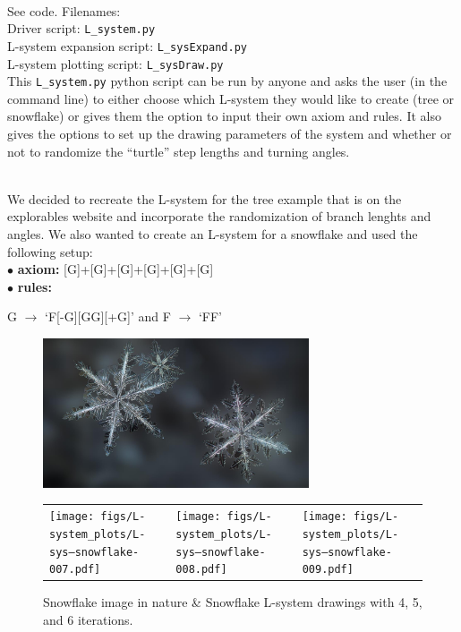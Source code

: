 \documentclass[11pt, oneside]{article}   	%
\newcommand{\prob}[2]{
\indent \\
\noindent{\color{green!50!blue}\bf {\large#1.}}
{\normalfont #2}
}
\begin{document}
\prob{1}{See code. Filenames:}\\
	\indent Driver script: \texttt{L\_system.py} \\
	\indent L-system expansion script: \texttt{L\_sysExpand.py} \\
	\indent L-system plotting script: \texttt{L\_sysDraw.py}\\
	This \texttt{L\_system.py} python script can be run by anyone and asks the user (in the command line) to either choose which L-system they would like to create (tree or snowflake) or gives them the option to input their own axiom and rules. It also gives the options to set up the drawing parameters of the system and whether or not to randomize the ``turtle'' step lengths and turning angles.

\prob{2}{We decided to recreate the L-system for the tree example that is on the explorables website and incorporate the randomization of branch lenghts and angles. We also wanted to create an L-system for a snowflake and used the following setup:\\
	\indent $\bullet$ {\bf axiom:}
	[G]+[G]+[G]+[G]+[G]+[G]
	\\
	\indent $\bullet$ {\bf rules:}}
	G $\rightarrow$ `F[-G][GG][+G]' and F $\rightarrow$ `FF'
	\begin{figure}[h!]
		\centering
		\vspace{-3mm}
		\includegraphics[width=0.7\textwidth]{figs/snowflake}
		\begin{tabular}{lll}
			\texttt{[image: figs/L-system\_plots/L-sys--snowflake-007.pdf]}
			&			\hspace{-9mm}
			\texttt{[image: figs/L-system\_plots/L-sys--snowflake-008.pdf]}
			&			\hspace{-9mm}
			\texttt{[image: figs/L-system\_plots/L-sys--snowflake-009.pdf]}
		\end{tabular}
		\vspace{-12mm}\caption{Snowflake image in nature \& Snowflake L-system drawings with 4, 5, and 6 iterations.}
		\label{snowflake_plots}
	\end{figure}
\end{document}
